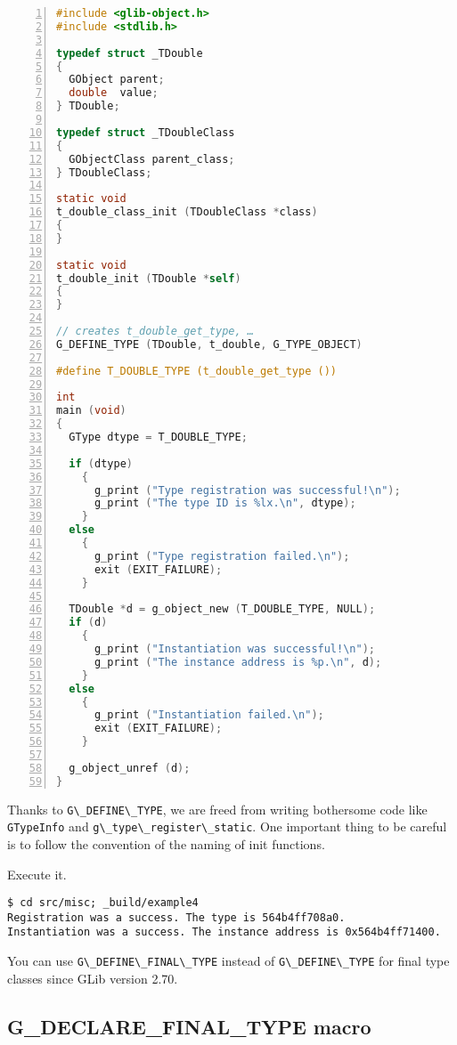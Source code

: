 \begin{lstlisting}[language=C, numbers=left]
#include <glib-object.h>
#include <stdlib.h>

typedef struct _TDouble
{
  GObject parent;
  double  value;
} TDouble;

typedef struct _TDoubleClass
{
  GObjectClass parent_class;
} TDoubleClass;

static void
t_double_class_init (TDoubleClass *class)
{
}

static void
t_double_init (TDouble *self)
{
}

// creates t_double_get_type, …
G_DEFINE_TYPE (TDouble, t_double, G_TYPE_OBJECT)

#define T_DOUBLE_TYPE (t_double_get_type ())

int
main (void)
{
  GType dtype = T_DOUBLE_TYPE;

  if (dtype)
    {
      g_print ("Type registration was successful!\n");
      g_print ("The type ID is %lx.\n", dtype);
    }
  else
    {
      g_print ("Type registration failed.\n");
      exit (EXIT_FAILURE);
    }

  TDouble *d = g_object_new (T_DOUBLE_TYPE, NULL);
  if (d)
    {
      g_print ("Instantiation was successful!\n");
      g_print ("The instance address is %p.\n", d);
    }
  else
    {
      g_print ("Instantiation failed.\n");
      exit (EXIT_FAILURE);
    }

  g_object_unref (d);
}
\end{lstlisting}

Thanks to \passthrough{\lstinline!G\_DEFINE\_TYPE!}, we are freed from
writing bothersome code like \passthrough{\lstinline!GTypeInfo!} and
\passthrough{\lstinline!g\_type\_register\_static!}. One important thing
to be careful is to follow the convention of the naming of init
functions.

Execute it.

\begin{lstlisting}
$ cd src/misc; _build/example4
Registration was a success. The type is 564b4ff708a0.
Instantiation was a success. The instance address is 0x564b4ff71400.
\end{lstlisting}

You can use \passthrough{\lstinline!G\_DEFINE\_FINAL\_TYPE!} instead of
\passthrough{\lstinline!G\_DEFINE\_TYPE!} for final type classes since
GLib version 2.70.

\subsection{G\_DECLARE\_FINAL\_TYPE
macro}\label{g_declare_final_type-macro}

